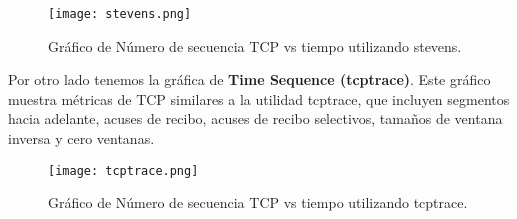 \documentclass[osajnl,twocolumn,showpacs,superscriptaddress,10pt]{revtex4-1} %
\begin{document}
\begin{figure}[H]
    \centering
    \texttt{[image: stevens.png]}
    \caption{Gráfico de Número de secuencia TCP vs tiempo utilizando stevens.}
    \label{stevens}
\end{figure}

Por otro lado tenemos la gráfica de \textbf{Time Sequence (tcptrace)}. Este gráfico muestra métricas de TCP 
similares a la utilidad tcptrace, que incluyen segmentos hacia adelante, acuses de recibo, 
acuses de recibo selectivos, tamaños de ventana inversa y cero ventanas. \\

\begin{figure}[H]
    \centering
    \texttt{[image: tcptrace.png]}
    \caption{Gráfico de Número de secuencia TCP vs tiempo utilizando tcptrace.}
    \label{tcptrace}
\end{figure}
\end{document}
